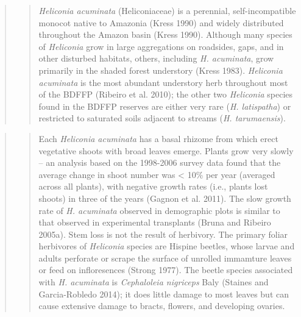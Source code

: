 \documentclass[
  12pt,
  man, donotrepeattitle,floatsintext]{apa6}
\begin{document}
\begin{quote}
\begin{quote}
\emph{Heliconia acuminata} (Heliconiaceae) is a perennial, self-incompatible monocot native to Amazonia (Kress 1990) and widely distributed throughout the Amazon basin (Kress 1990). Although many species of \emph{Heliconia} grow in large aggregations on roadsides, gaps, and in other disturbed habitats, others, including \emph{H. acuminata}, grow primarily in the shaded forest understory (Kress 1983). \emph{Heliconia acuminata} is the most abundant understory herb throughout most of the BDFFP (Ribeiro et al. 2010); the other two \emph{Heliconia} species found in the BDFFP reserves are either very rare (\emph{H. latispatha}) or restricted to saturated soils adjacent to streams (\emph{H. tarumaensis}).
\end{quote}
\end{quote}

\begin{quote}
\begin{quote}
Each \emph{Heliconia acuminata} has a basal rhizome from which erect vegetative shoots with broad leaves emerge. Plants grow very slowly -- an analysis based on the 1998-2006 survey data found that the average change in shoot number was \textless{} 10\% per year (averaged across all plants), with negative growth rates (i.e., plants lost shoots) in three of the years (Gagnon et al. 2011). The slow growth rate of \emph{H. acuminata} observed in demographic plots is similar to that observed in experimental transplants (Bruna and Ribeiro 2005a). Stem loss is not the result of herbivory. The primary foliar herbivores of \emph{Heliconia} species are Hispine beetles, whose larvae and adults perforate or scrape the surface of unrolled immamture leaves or feed on infloresences (Strong 1977). The beetle species associated with \emph{H. acuminata} is \emph{Cephaloleia nigriceps} Baly (Staines and Garcia-Robledo 2014); it does little damage to most leaves but can cause extensive damage to bracts, flowers, and developing ovaries.
\end{quote}
\end{quote}
\end{document}
